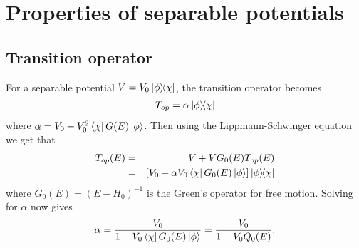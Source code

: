 
\chapter{Properties of separable potentials}
\label{Appendix:SeparablePotentials}

\section{Transition operator}
\label{Appendix:SeparablePotentials_TransitionOperator}
 For a separable potential $V=V_0 \ketbra{\phi}{\chi}$, the transition operator becomes
\begin{eqnarray}
T_{op}=\alpha \ketbra{\phi}{\chi}
\end{eqnarray}
where $\alpha=V_{0}+V_{0}^{2}\bra{\chi}G(E)\ket{\phi}$. Then using the Lippmann-Schwinger equation we get that
%
\begin{eqnarray}
T_{op}(E)&=&V+VG_{0}(E)T_{op}(E)
\nonumber \\
&=& \left[V_{0}+\alpha V_{0} \bra{\chi}G_{0}(E)\ket{\phi}\right]\ketbra{\phi}{\chi}
\end{eqnarray}
%
where $G_{0}(E)=(E-H_{0})^{-1}$ is the Green's operator for free motion. Solving for $\alpha$ now gives
%
\begin{eqnarray}
\alpha =\frac{V_{0}}{1-V_{0} \bra{\chi}G_{0}(E)\ket{\phi}}
		   =\frac{V_{0}}{1-V_{0} Q_{0}(E)}.
\end{eqnarray}
%
%
%
%
%
